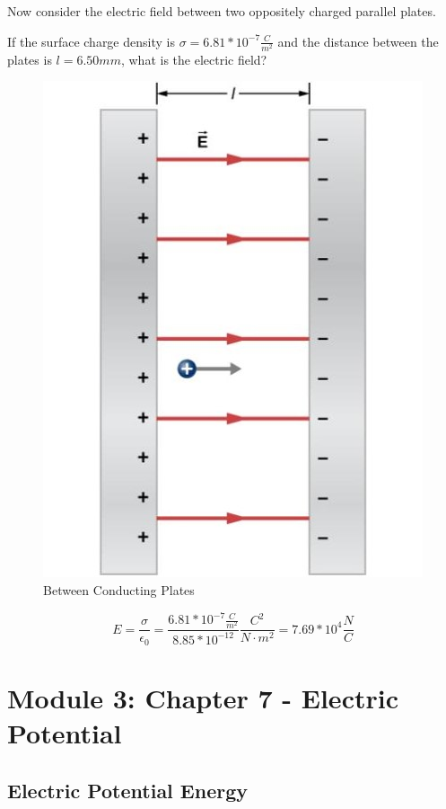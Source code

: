 \documentclass[14pt]{memoir}
\begin{document}
Now consider the electric field between two oppositely charged parallel plates.

If the surface charge density is $\sigma = 6.81 * 10^{-7} \frac{C}{m^2}$ and the distance between the plates is $l = 6.50mm$, what is the electric field? 


\begin{figure}[H]
\begin{center}
\includegraphics[scale=0.30]{fig/fig_06_41.jpg}
\caption{Between Conducting Plates}
\label{fig:06_41}
\end{center}
\end{figure}

\begin{equation}
E = \frac{\sigma}{\epsilon_0} = \frac{ 6.81 * 10^{-7} \frac{C}{m^2}}{8.85 * 10^{-12}} \frac{C^2}{N \cdot m^2} = 7.69 * 10^{4} \frac{N}{C}
\end{equation}

\chapter{Module 3: Chapter 7 - Electric Potential}

\section{Electric Potential Energy}
\end{document}
